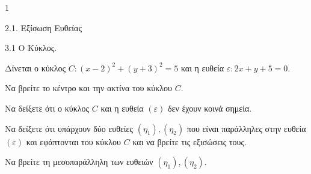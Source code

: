 \begin{ylh}{1}
    \item 2.1. Εξίσωση Ευθείας
    \item 3.1 Ο Κύκλος.
\end{ylh}
Δίνεται ο κύκλος $C: (x-2)^2+(y+3)^2=5$ και η ευθεία $\varepsilon: 2x+y+5=0$.
\begin{alist}
\item Να βρείτε το κέντρο και την ακτίνα του κύκλου $C$. 
\item Να δείξετε ότι ο κύκλος $C$ και η ευθεία $(\varepsilon)$ δεν έχουν κοινά σημεία. 
\item Να δείξετε ότι υπάρχουν δύο ευθείες $(\eta_1),(\eta_2)$ που είναι παράλληλες στην ευθεία $(\varepsilon)$ και εφάπτονται του κύκλου $C$ και να βρείτε τις εξισώσεις τους. 
\item Να βρείτε τη μεσοπαράλληλη των ευθειών $(\eta_1),(\eta_2)$. 
\end{alist}